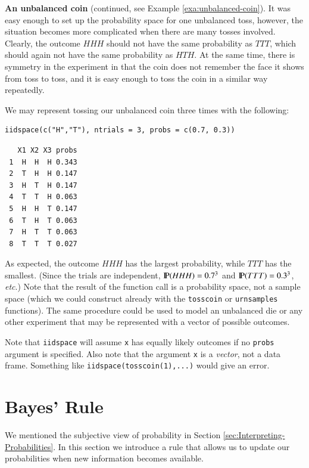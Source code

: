\documentclass[captions=tableheading]{scrbook}
\begin{document}
\begin{example}
\textbf{An unbalanced coin} (continued, see Example \ref{exa:unbalanced-coin}). It was easy enough to set up the probability space for one unbalanced toss, however, the situation becomes more complicated when there are many tosses involved. Clearly, the outcome \(HHH\) should not have the same probability as \(TTT\), which should again not have the same probability as \(HTH\). At the same time, there is symmetry in the experiment in that the coin does not remember the face it shows from toss to toss, and it is easy enough to toss the coin in a similar way repeatedly.

We may represent tossing our unbalanced coin three times with the following: 


\begin{verbatim}
iidspace(c("H","T"), ntrials = 3, probs = c(0.7, 0.3))
\end{verbatim}

\begin{verbatim}
   X1 X2 X3 probs
 1  H  H  H 0.343
 2  T  H  H 0.147
 3  H  T  H 0.147
 4  T  T  H 0.063
 5  H  H  T 0.147
 6  T  H  T 0.063
 7  H  T  T 0.063
 8  T  T  T 0.027
\end{verbatim}

As expected, the outcome \(HHH\) has the largest probability, while \(TTT\) has the smallest. (Since the trials are independent, \(\P(HHH)=0.7^{3}\) and \(\P(TTT)=0.3^{3}\), \textit{etc}.) Note that the result of the function call is a probability space, not a sample space (which we could construct already with the \texttt{tosscoin} or \texttt{urnsamples} functions). The same procedure could be used to model an unbalanced die or any other experiment that may be represented with a vector of possible outcomes.

\end{example}

Note that \texttt{iidspace} will assume \texttt{x} has equally likely outcomes if no \texttt{probs} argument is specified. Also note that the argument \texttt{x} is a \emph{vector}, not a data frame. Something like \texttt{iidspace(tosscoin(1),...)} would give an error.
\section{Bayes' Rule}
\label{sec-4-8}

\label{sec:Bayes'-Rule}

We mentioned the subjective view of probability in Section \ref{sec:Interpreting-Probabilities}. In this section we introduce a rule that allows us to update our probabilities when new information becomes available. 
\end{document}
